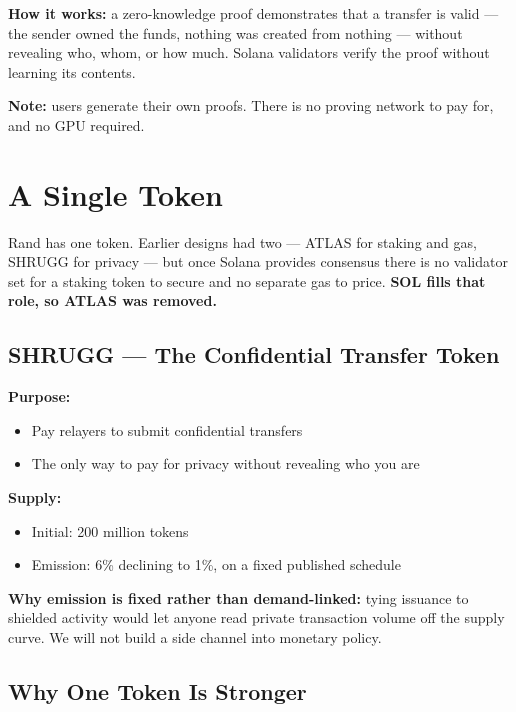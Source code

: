\documentclass[11pt,a4paper]{article}
\begin{document}
\textbf{How it works:} a zero-knowledge proof demonstrates that a transfer is valid --- the sender owned the funds, nothing was created from nothing --- without revealing who, whom, or how much. Solana validators verify the proof without learning its contents.

\textbf{Note:} users generate their own proofs. There is no proving network to pay for, and no GPU required.

\section{A Single Token}

Rand has one token. Earlier designs had two --- ATLAS for staking and gas, SHRUGG for privacy --- but once Solana provides consensus there is no validator set for a staking token to secure and no separate gas to price. \textbf{SOL fills that role, so ATLAS was removed.}

\subsection{SHRUGG --- The Confidential Transfer Token}

\textbf{Purpose:}
\begin{itemize}[leftmargin=*]
    \item Pay relayers to submit confidential transfers
    \item The only way to pay for privacy without revealing who you are
\end{itemize}

\textbf{Supply:}
\begin{itemize}[leftmargin=*]
    \item Initial: 200 million tokens
    \item Emission: 6\% declining to 1\%, on a fixed published schedule
\end{itemize}

\textbf{Why emission is fixed rather than demand-linked:} tying issuance to shielded activity would let anyone read private transaction volume off the supply curve. We will not build a side channel into monetary policy.

\subsection{Why One Token Is Stronger}
\end{document}
